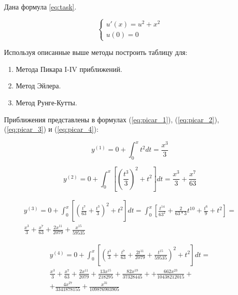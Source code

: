 Дана формула {\ref{eq:task}}.

\begin{equation}
	{\begin{cases}
			u'(x) = u^2 + x^2 \\
			u(0) = 0
	\end{cases}}
	\label{eq:task}
\end{equation}

Используя описанные выше методы построить таблицу для:

\begin{enumerate}
	\item Метода Пикара I-IV приближений.
	\item Метод Эйлера.
	\item Метод Рунге-Кутты.
\end{enumerate}

Приближения представлены в формулах (\ref{eq:picar_1}), (\ref{eq:picar_2}), (\ref{eq:picar_3}) и (\ref{eq:picar_4}):

\begin{equation}
	\label{eq:picar_1}
	y^{(1)} = 0 + \int_{0}^{x} t^2 dt= \frac{x^3}{3} 
\end{equation}

\begin{equation}
	\label{eq:picar_2}
	y^{(2)} = 0 + \int_{0}^{x}\left[ \left( \frac{t^3}{3} \right)^2 + t^2 \right] dt = \frac{x^3}{3} + \frac{x^7}{63}
\end{equation}

\begin{equation}
	\label{eq:picar_3}
	\begin{split}
		y^{(3)} = 0 + \int_{0}^{x}\left[ \left(\frac{t^7}{63} + \frac{t^3}{3} \right)^2 + t^2 \right] dt = 
		\int_{0}^{x}\left[ \frac{t^{14}}{63^2} + \frac{2}{63*3}t^{10} + \frac{t^6}{9} + t^2 \right] = \\
		\frac{x^3}{3} + \frac{x^7}{63} + \frac{2x^{11}}{2079} + \frac{x^{15}}{59535}
	\end{split}
\end{equation}

\begin{equation}
	\label{eq:picar_4}
	\begin{split}
		y^{(4)} = 0 + \int_{0}^{x}\left[ \left( \frac{t^3}{3} + \frac{t^7}{63} + \frac{2t^{11}}{2079} + \frac{t^{15}}{59535} \right)^2 + t^2 \right] dt = \\ 
		\frac{x^3}{3} + \frac{x^{7}}{63} + \frac{2x^{11}}{2079} + \frac{13x^{15}}{218295} + \frac{82x^{19}}{37328445} + 
		+ \frac{662x^{23}}{10438212015} + \\
		+ \frac{4x^{27}}{3341878155} + \frac{x^{31}}{109876903905}
	\end{split}
\end{equation}